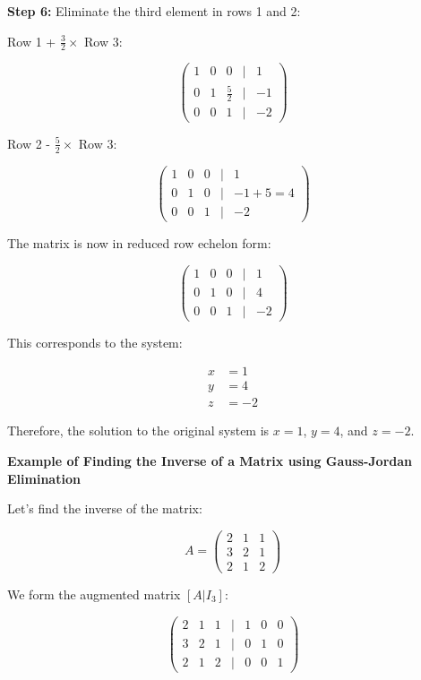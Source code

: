 \textbf{Step 6:} Eliminate the third element in rows 1 and 2:

Row 1 + \(\frac{3}{2} \times\) Row 3:

\[
    \begin{pmatrix}
    1 & 0 & 0 & | & 1 \\
    0 & 1 & \frac{5}{2} & | & -1 \\
    0 & 0 & 1 & | & -2
    \end{pmatrix}
\]

Row 2 - \(\frac{5}{2} \times\) Row 3:

\[
    \begin{pmatrix}
    1 & 0 & 0 & | & 1 \\
    0 & 1 & 0 & | & -1 + 5 = 4 \\
    0 & 0 & 1 & | & -2
    \end{pmatrix}
\]

The matrix is now in reduced row echelon form:

\[
    \begin{pmatrix}
    1 & 0 & 0 & | & 1 \\
    0 & 1 & 0 & | & 4 \\
    0 & 0 & 1 & | & -2
    \end{pmatrix}
\]

This corresponds to the system:

\begin{align*}
    x &= 1 \\
    y &= 4 \\
    z &= -2
\end{align*}

Therefore, the solution to the original system is \(x = 1\), \(y = 4\), and \(z = -2\).

\textbf{Example of Finding the Inverse of a Matrix using Gauss-Jordan Elimination}

Let's find the inverse of the matrix:

\[
    A = 
    \begin{pmatrix}
    2 & 1 & 1 \\
    3 & 2 & 1 \\
    2 & 1 & 2
    \end{pmatrix}
\]

We form the augmented matrix \([A|I_3]\):

\[
    \begin{pmatrix}
    2 & 1 & 1 & | & 1 & 0 & 0 \\
    3 & 2 & 1 & | & 0 & 1 & 0 \\
    2 & 1 & 2 & | & 0 & 0 & 1
    \end{pmatrix}
\]

